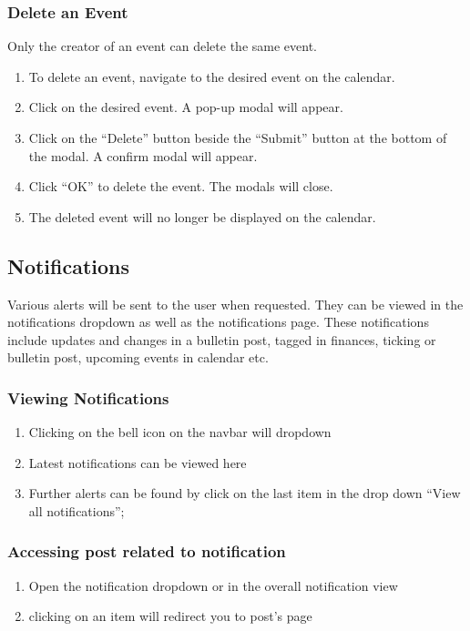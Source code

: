 \documentclass[12pt]{article}
\begin{document}
    \subsubsection{Delete an Event}
    Only the creator of an event can delete the same event.
    \begin{enumerate}
        \item To delete an event, navigate to the desired event on the calendar.
        \item Click on the desired event. A pop-up modal will appear.
        \item Click on the ``Delete'' button beside the ``Submit'' button at the bottom of the modal.  A confirm modal will appear.
        \item Click ``OK'' to delete the event. The modals will close.
        \item The deleted event will no longer be displayed on the calendar.
    \end{enumerate}

    \subsection{Notifications}
    Various alerts will be sent to the user when requested. They can be viewed in the notifications dropdown as well as the notifications page.
    These notifications include updates and changes in a bulletin post, tagged in finances, ticking or bulletin post, upcoming events in calendar etc.
    \subsubsection{Viewing Notifications}
    \begin{enumerate}
        \item Clicking on the bell icon on the navbar will dropdown
        \item Latest notifications can be viewed here
        \item Further alerts can be found by click on the last item in the drop down ``View all notifications'';
    \end{enumerate}
    \subsubsection{Accessing post related to notification}
    \begin{enumerate}
        \item Open the notification dropdown or in the overall notification view
        \item clicking on an item will redirect you to post's page
    \end{enumerate}
\end{document}
